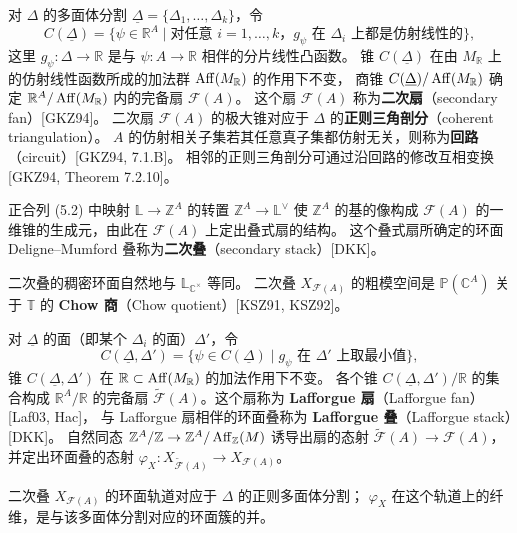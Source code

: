对 $\Delta$ 的多面体分割 $\underline{\Delta}=\{\Delta_{1},\dots,\Delta_{k}\}$，令
\begin{equation}
  C(\underline{\Delta})=\{\psi\in\mathbb{R}^{A}\mid\text{对任意 }i=1,\dots,k\text{，}g_{\psi}\text{ 在 }\Delta_{i}\text{ 上都是仿射线性的}\}, \tag{5.5}
\end{equation}
这里 $g_{\psi}\colon\Delta\to\mathbb{R}$ 是与 $\psi\colon A\to\mathbb{R}$ 相伴的分片线性凸函数。
锥 $C(\underline{\Delta})$ 在由 $M_{\mathbb{R}}$ 上的仿射线性函数所成的加法群 $\operatorname{Aff}(M_{\mathbb{R}})$ 的作用下不变，
商锥 $C(\underline{\Delta})/\operatorname{Aff}(M_{\mathbb{R}})$ 确定 $\mathbb{R}^{A}/\operatorname{Aff}(M_{\mathbb{R}})$ 内的完备扇 $\mathcal{F}(A)$。
这个扇 $\mathcal{F}(A)$ 称为\textbf{二次扇}（secondary fan）[GKZ94]。
二次扇 $\mathcal{F}(A)$ 的极大锥对应于 $\Delta$ 的\textbf{正则三角剖分}（coherent triangulation）。
$A$ 的仿射相关子集若其任意真子集都仿射无关，则称为\textbf{回路}（circuit）[GKZ94, 7.1.B]。
相邻的正则三角剖分可通过沿回路的修改互相变换 [GKZ94, Theorem 7.2.10]。

正合列 (5.2) 中映射 $\mathbb{L}\to\mathbb{Z}^{A}$ 的转置 $\mathbb{Z}^{A}\to\mathbb{L}^{\vee}$ 使 $\mathbb{Z}^{A}$ 的基的像构成
$\mathcal{F}(A)$ 的一维锥的生成元，由此在 $\mathcal{F}(A)$ 上定出叠式扇的结构。
这个叠式扇所确定的环面 Deligne–Mumford 叠称为\textbf{二次叠}（secondary stack）[DKK]。


二次叠的稠密环面自然地与 $\mathbb{L}_{\mathbb{C}^{\times}}$ 等同。
二次叠 $X_{\mathcal{F}(A)}$ 的粗模空间是 $\mathbb{P}(\mathbb{C}^{A})$ 关于 $\mathbb{T}$ 的
\textbf{Chow 商}（Chow quotient）[KSZ91, KSZ92]。

对 $\underline{\Delta}$ 的面（即某个 $\Delta_{i}$ 的面）$\Delta'$，令
\[
  C(\underline{\Delta},\Delta')=\{\psi\in C(\underline{\Delta})\mid
  g_{\psi}\text{ 在 }\Delta'\text{ 上取最小值}\},
\]
锥 $C(\underline{\Delta},\Delta')$ 在 $\mathbb{R}\subset\operatorname{Aff}(M_{\mathbb{R}})$ 的加法作用下不变。
各个锥 $C(\underline{\Delta},\Delta')/\mathbb{R}$ 的集合构成 $\mathbb{R}^{A}/\mathbb{R}$ 的完备扇
$\tilde{\mathcal{F}}(A)$。这个扇称为 \textbf{Lafforgue 扇}（Lafforgue fan）[Laf03, Hac]，
与 Lafforgue 扇相伴的环面叠称为 \textbf{Lafforgue 叠}（Lafforgue stack）[DKK]。
自然同态 $\mathbb{Z}^{A}/\mathbb{Z}\to\mathbb{Z}^{A}/\operatorname{Aff}_{\mathbb{Z}}(M)$ 诱导出扇的态射
$\tilde{\mathcal{F}}(A)\to\mathcal{F}(A)$，并定出环面叠的态射
$\varphi_{X}\colon X_{\tilde{\mathcal{F}}(A)}\to X_{\mathcal{F}(A)}$。

二次叠 $X_{\mathcal{F}(A)}$ 的环面轨道对应于 $\Delta$ 的正则多面体分割；
$\varphi_{X}$ 在这个轨道上的纤维，是与该多面体分割对应的环面簇的并。

